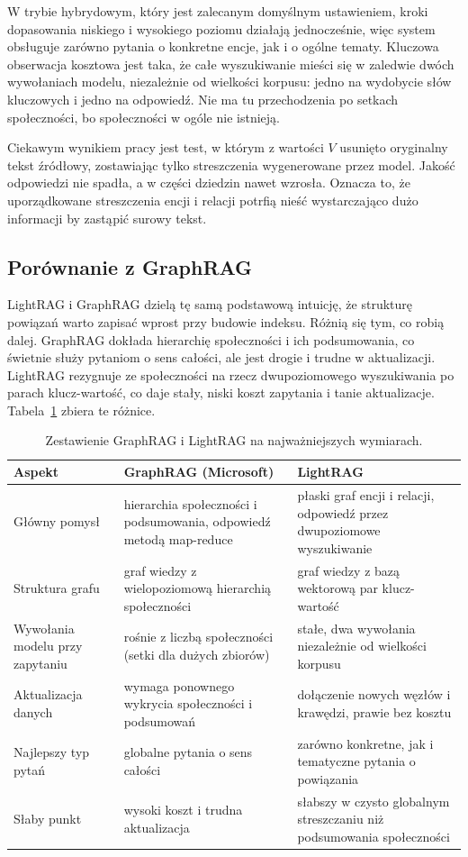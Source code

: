 \documentclass[11pt,a4paper]{article}
\begin{document}
W trybie hybrydowym, który jest zalecanym domyślnym ustawieniem, kroki dopasowania niskiego i
wysokiego poziomu działają jednocześnie, więc system obsługuje zarówno pytania o konkretne
encje, jak i o ogólne tematy. Kluczowa obserwacja kosztowa jest taka, że całe wyszukiwanie
mieści się w zaledwie dwóch wywołaniach modelu, niezależnie od wielkości korpusu: jedno na
wydobycie słów kluczowych i jedno na odpowiedź. Nie ma tu przechodzenia po setkach
społeczności, bo społeczności w ogóle nie istnieją.

Ciekawym wynikiem pracy jest test, w którym z wartości $V$ usunięto oryginalny
tekst źródłowy, zostawiając tylko streszczenia wygenerowane przez model. Jakość
odpowiedzi nie spadła, a w części dziedzin nawet wzrosła. Oznacza to, że
uporządkowane streszczenia encji i relacji potrfią nieść wystarczająco dużo
informacji by zastąpić surowy tekst.

\subsection{Porównanie z GraphRAG}

LightRAG i GraphRAG dzielą tę samą podstawową intuicję, że strukturę powiązań warto zapisać
wprost przy budowie indeksu. Różnią się tym, co robią dalej. GraphRAG dokłada hierarchię
społeczności i ich podsumowania, co świetnie służy pytaniom o sens całości, ale jest drogie i
trudne w aktualizacji. LightRAG rezygnuje ze społeczności na rzecz dwupoziomowego
wyszukiwania po parach klucz-wartość, co daje stały, niski koszt zapytania i tanie
aktualizacje. Tabela~\ref{tab:porownanie} zbiera te różnice.

\begin{table}[h!]
\centering
\renewcommand{\arraystretch}{1.35}
\begin{tabularx}{\textwidth}{@{} p{3.4cm} X X @{}}
\toprule
\textbf{Aspekt} & \textbf{GraphRAG (Microsoft)} & \textbf{LightRAG} \\
\midrule
Główny pomysł
  & hierarchia społeczności i podsumowania, odpowiedź metodą map-reduce
  & płaski graf encji i relacji, odpowiedź przez dwupoziomowe wyszukiwanie \\
Struktura grafu
  & graf wiedzy z wielopoziomową hierarchią społeczności
  & graf wiedzy z bazą wektorową par klucz-wartość \\
Wywołania modelu przy zapytaniu
  & rośnie z liczbą społeczności (setki dla dużych zbiorów)
  & stałe, dwa wywołania niezależnie od wielkości korpusu \\
Aktualizacja danych
  & wymaga ponownego wykrycia społeczności i podsumowań
  & dołączenie nowych węzłów i krawędzi, prawie bez kosztu \\
Najlepszy typ pytań
  & globalne pytania o sens całości
  & zarówno konkretne, jak i tematyczne pytania o powiązania \\
Słaby punkt
  & wysoki koszt i trudna aktualizacja
  & słabszy w czysto globalnym streszczaniu niż podsumowania społeczności \\
\bottomrule
\end{tabularx}
\caption{Zestawienie GraphRAG i LightRAG na najważniejszych wymiarach.}
\label{tab:porownanie}
\end{table}
\end{document}
